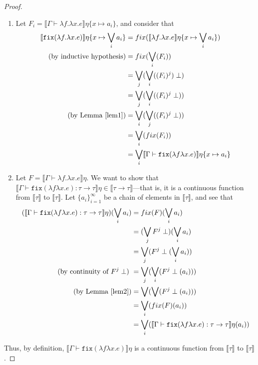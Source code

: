 \begin{proof}
\begin{itemize}
 \begin{enumerate}
\item Let $F_i = \llbracket \Gamma \vdash \lambda f. \lambda x.e\rrbracket\eta\{x\mapsto a_i\}$, and consider that 
 \begin{align*}
 \llbracket \texttt{fix} (\lambda f.\lambda x.e)\rrbracket\eta\{x\mapsto \bigvee_i a_i\} &= 
 fix(\llbracket \lambda f. \lambda x.e \rrbracket\eta\{x\mapsto \bigvee_i a_i\})\\
 \text{(by inductive hypothesis)} &= fix(\bigvee_i(F_i)) \\
 &= \bigvee_j(\bigvee_i((F_i)^j )\perp) \\
 &= \bigvee_j(\bigvee_i((F_i)^j \perp)) \\ 
\text{(by Lemma \ref{lem1})} &= \bigvee_i(\bigvee_j((F_i)^j \perp)) \\ 
&= \bigvee_i(fix(F_i))\\
&= \bigvee_i \llbracket \Gamma \vdash \texttt{fix}(\lambda f \lambda x.e)\rrbracket\eta\{x\mapsto a_i\}
 \end{align*}
 \item Let $F = \llbracket \Gamma \vdash \lambda f. \lambda x.e\rrbracket\eta$. We want to show that 
 $\llbracket\Gamma\vdash\texttt{fix}(\lambda f \lambda x.e) : \tau 
 \rightarrow\tau\rrbracket\eta \in \llbracket \tau \rightarrow \tau \rrbracket$---that is, it is a continuous function from 
 $\llbracket \tau \rrbracket$ to $\llbracket \tau \rrbracket$. Let $\{a_i\}^{\infty}_{i=1}$ be a chain of elements in $\llbracket \tau \rrbracket$,
  and see that 
 \begin{align*}
 (\llbracket\Gamma\vdash\texttt{fix}(\lambda f \lambda x.e) : \tau \rightarrow\tau\rrbracket\eta)( \bigvee_i a_i) &= 
 fix(F)(\bigvee_i a_i)\\
 &=(\bigvee_j F^j \perp)(\bigvee_i a_i)\\
 &= \bigvee_j (F^j \perp(\bigvee_i a_i))\\ 
 \text{(by continuity of $F^j \perp$) }&= \bigvee_j(\bigvee_i(F^j \perp(a_i)))\\ 
 \text{(by Lemma \ref{lem2})} &=\bigvee(\bigvee(F^j \perp(a_i))) \\
 &= \bigvee_i(fix(F)(a_i))\\
 &= \bigvee_i(\llbracket\Gamma\vdash\texttt{fix}(\lambda f \lambda x.e) : \tau \rightarrow\tau\rrbracket\eta(a_i))\\
 \end{align*}
 \end{enumerate}
 \end{itemize}
 Thus, by definition, $\llbracket \Gamma \vdash \texttt{fix}(\lambda f \lambda x.e) \rrbracket\eta$ is a continuous function
 from $\llbracket \tau \rrbracket$ to $\llbracket \tau \rrbracket$.
 \end{proof}
